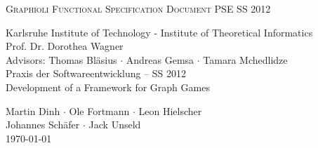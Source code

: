 \begin{titlepage}
\begin{center}
\fontsize{40}{50}\selectfont
        \vfill
        \textsc{Graphioli}
		\vfill
        \textsc{Functional Specification Document}
        \vfill
\Large
PSE SS 2012
  \vfill
 \newpage
 
 \null
 \vfill
 \fontsize{12}{16}\selectfont
 Karlsruhe Institute of Technology - Institute of Theoretical Informatics \\
 Prof. Dr. Dorothea Wagner \\
 \vspace{.5cm}
 Advisors: Thomas Bläsius $\cdot$ Andreas Gemsa $\cdot$ Tamara Mchedlidze \\
 
 \vspace{2cm}
 \Large
 Praxis der Softwareentwicklung -- SS 2012 \\
 Development of a Framework for Graph Games \\
  \medskip
  \vspace{2cm}
  
    Martin Dinh $\cdot$ Ole Fortmann $\cdot$ Leon Hielscher \\ Johannes Schäfer $\cdot$ Jack Unseld
  \vspace{2cm} \\
  \today
\end{center}

  \vfill

\end{titlepage}